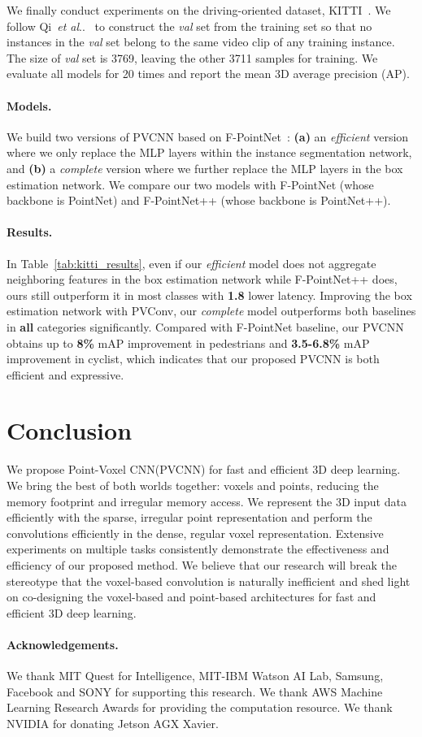 \documentclass{article}
\makeatletter
\newcommand{\tab}[1]{Table~\ref{#1}}
\DeclareRobustCommand\onedot{\futurelet\@let@token\@onedot}
\def\@onedot{\ifx\@let@token.\else.\null\fi\xspace}
\def\etal{\emph{et al}\onedot}
\newcommand{\myparagraph}[1]{\vspace{-6pt}\paragraph{#1}}
\def\model{Point-Voxel CNN\xspace}
\def\modelshort{PVCNN\xspace}
\def\convshort{PVConv\xspace}
\makeatother
\begin{document}
We finally conduct experiments on the driving-oriented dataset, KITTI~\cite{Geiger:2013kt}. We follow Qi~\etal~\cite{Qi:2018fd} to construct the \emph{val} set from the training set so that no instances in the \emph{val} set belong to the same video clip of any training instance. The size of \emph{val} set is 3769, leaving the other 3711 samples for training. We evaluate all models for 20 times and report the mean 3D average precision (AP).

\myparagraph{Models.}

We build two versions of \modelshort based on F-PointNet~\cite{Qi:2018fd}: \textbf{(a)} an \emph{efficient} version where we only replace the MLP layers within the instance segmentation network, and \textbf{(b)} a \emph{complete} version where we further replace the MLP layers in the box estimation network. We compare our two models with F-PointNet (whose backbone is PointNet) and F-PointNet++ (whose backbone is PointNet++).

\myparagraph{Results.}

In \tab{tab:kitti_results}, even if our \emph{efficient} model does not aggregate neighboring features in the box estimation network while F-PointNet++ does, ours still outperform it in most classes with \textbf{1.8} lower latency. Improving the box estimation network with \convshort, our \emph{complete} model outperforms both baselines in \textbf{all} categories significantly. Compared with F-PointNet baseline, our \modelshort obtains up to \textbf{8\%} mAP improvement in pedestrians and \textbf{3.5-6.8\%} mAP improvement in cyclist, which indicates that our proposed \modelshort is both efficient and expressive. \section{Conclusion}

We propose \model (\modelshort) for fast and efficient 3D deep learning. We bring the best of both worlds together: voxels and points, reducing the memory footprint and irregular memory access. We represent the 3D input data efficiently with the sparse, irregular point representation and perform the convolutions efficiently in the dense, regular voxel representation. Extensive experiments on multiple tasks consistently demonstrate the effectiveness and efficiency of our proposed method. We believe that our research will break the stereotype that the voxel-based convolution is naturally inefficient and shed light on co-designing the voxel-based and point-based architectures for fast and efficient 3D deep learning. \myparagraph{Acknowledgements.}

We thank MIT Quest for Intelligence, MIT-IBM Watson AI Lab, Samsung, Facebook and SONY for supporting this research. We thank AWS Machine Learning Research Awards for providing the computation resource. We thank NVIDIA for donating Jetson AGX Xavier. 
{\small


}
\end{document}
